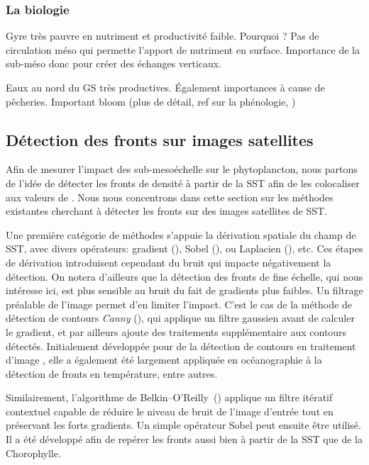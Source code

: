\subsubsection{La biologie}
\label{sec:gs-biologie}

Gyre très pauvre en nutriment et productivité faible.
Pourquoi ?
Pas de circulation méso qui permette l'apport de nutriment en surface.
Importance de la sub-méso donc pour créer des échanges verticaux.

Eaux au nord du GS très productives.
Également importances à cause de pêcheries.
Important bloom (plus de détail, ref sur la phénologie, )


\subsection{Détection des fronts sur images satellites}
\label{sec:detection-fronts}

Afin de mesurer l'impact des sub-mesoéchelle sur le phytoplancton, nous partons de l'idée de détecter les fronts de densité à partir de la SST afin de les colocaliser aux valeurs de .
Nous nous concentrons dans cette section sur les méthodes existantes cherchant à détecter les fronts sur des images satellites de SST.

Une première catégorie de méthodes s'appuie la dérivation spatiale du champ de SST, avec divers opérateurs: gradient (\cite{kazmin_1996, moore_1997, kostianoy_2004}), Sobel (\cite{sauter_1994}), ou Laplacien (\cite{holyer_1989}), etc.
Ces étapes de dérivation introduisent cependant du bruit qui impacte négativement la détection.
On notera d'ailleurs que la détection des fronts de fine échelle, qui nous intéresse ici, est plus sensible au bruit du fait de gradients plus faibles.
Un filtrage préalable de l'image permet d'en limiter l'impact.
C'est le cas de la méthode de détection de contours \emph{Canny} (\cite{canny_1986}), qui applique un filtre gaussien avant de calculer le gradient, et par ailleurs ajoute des traitements supplémentaire aux contours détectés.
Initialement développée pour de la détection de contours en traitement d'image , elle a également été largement appliquée en océanographie à la détection de fronts en température, entre autres.

Similairement, l'algorithme de Belkin--O'Reilly~(\cite{belkin_2009}) applique un filtre itératif contextuel capable de réduire le niveau de bruit de l'image d'entrée tout en préservant les forts gradients.
Un simple opérateur Sobel peut ensuite être utilisé.
Il a été développé afin de repérer les fronts aussi bien à partir de la SST que de la Chorophylle.

